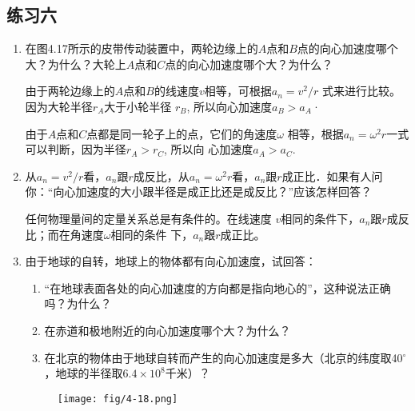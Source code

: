 \subsection{练习六}
\begin{enumerate}
	\item 在图4.17所示的皮带传动装置中，两轮边缘上的$A$点和$B$点的向心加速度哪个大？为什么？大轮上$A$点和$C$点的向心加速度哪个大？为什么？

    \begin{solution}
由于两轮边缘上的$A$点和$B$的线速度$v$相等，可根据$a_n=v^2/r$
式来进行比较。因为大轮半径$r_A$大于小轮半径
$r_B$, 所以向心加速度$a_B>a_A$·

由于$A$点和$C$点都是同一轮子上的点，它们的角速度$\omega$
相等，根据$a_n=\omega^2r$一式可以判断，因为半径$r_A>r_C$, 所以向
心加速度$a_A>a_C$.    
    \end{solution}
	\item 从$a_n=v^2/r$看，$a_n$跟$r$成反比，从$a_n=\omega^2r$看，$a_n$跟$r$成正比．如果有人问你：“向心加速度的大小跟半径是成正比还是成反比？”应该怎样回答？

    \begin{solution}
    任何物理量间的定量关系总是有条件的。在线速度
$v$相同的条件下，$a_n$跟$r$成反比；而在角速度$\omega$相同的条件
下，$a_n$跟$r$成正比。
    \end{solution}
	\item 由于地球的自转，地球上的物体都有向心加速度，试回答：
\begin{enumerate}
	\item “在地球表面各处的向心加速度的方向都是指向地心的”，这种说法正确吗？为什么？
	\item 在赤道和极地附近的向心加速度哪个大？为什么？
	\item 在北京的物体由于地球自转而产生的向心加速度是多大（北京的纬度取40$^\circ$，地球的半径取$6.4\times 10^8$千米）？	
\end{enumerate}

\begin{figure}[htp]
    \centering
    \texttt{[image: fig/4-18.png]}
    \caption{}
    \end{figure}


\end{enumerate}
